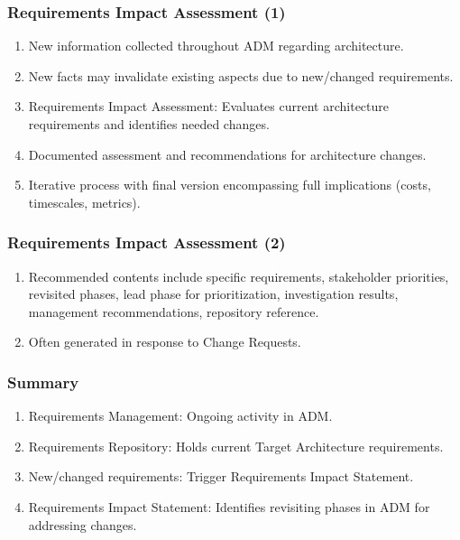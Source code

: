 \documentclass[aspectratio=169, table]{beamer}
\begin{document}
	\begin{frame}
		\frametitle{Requirements Impact Assessment (1)}
		\vspace{22pt}
		\begin{enumerate}
			\item New information collected throughout ADM regarding architecture.
			\item New facts may invalidate existing aspects due to new/changed requirements.
			\item Requirements Impact Assessment: Evaluates current architecture requirements and identifies needed changes.
			\item Documented assessment and recommendations for architecture changes.
			\item Iterative process with final version encompassing full implications (costs, timescales, metrics).
		\end{enumerate}
		
	\end{frame}

	\begin{frame}
		\frametitle{Requirements Impact Assessment (2)}
		\vspace{22pt}
		\begin{enumerate}
			\item Recommended contents include specific requirements, stakeholder priorities, revisited phases, lead phase for prioritization, investigation results, management recommendations, repository reference.
			\item Often generated in response to Change Requests.
		\end{enumerate}
		
	\end{frame}
	
	\begin{frame}
		\frametitle{Summary}
		\begin{enumerate}
			\item Requirements Management: Ongoing activity in ADM.
			\item Requirements Repository: Holds current Target Architecture requirements.
			\item New/changed requirements: Trigger Requirements Impact Statement.
			\item Requirements Impact Statement: Identifies revisiting phases in ADM for addressing changes.
		\end{enumerate}
	\end{frame}
	
\end{document}
